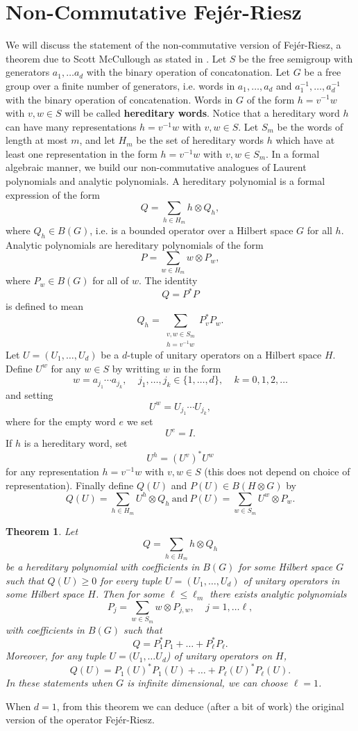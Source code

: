 \documentclass[12 pt]{article}
\theoremstyle{plain}
\newtheorem{theorem}{Theorem}[section]
\theoremstyle{definition}
\begin{document}
\section{Non-Commutative Fej\'{e}r-Riesz} We will discuss the statement of the non-commutative version of Fej\'{e}r-Riesz, a theorem due to Scott McCullough as stated in \cite{Dritschel}. Let $S$ be the free semigroup with generators $a_1, \ldots a_d$ with the binary operation of concatonation. Let $G$ be a free group over a finite number of generators, i.e. words in $a_1,\ldots,a_d$ and $a_1^{-1},\ldots, a_d^{-1}$ with the binary operation of concatenation. Words in $G$ of the form $h=v^{-1}w$  with $v, w\in S$ will be called {\bf hereditary words}. Notice that a hereditary word $h$ can have many representations $h=v^{-1}w$ with $v,w\in S$. Let $S_m$ be the words of length at most $m$, and let $H_m$ be the set of hereditary words $h$ which have at least one representation in the form $h=v^{-1}w$ with $v,w\in S_m$. In a formal algebraic manner, we build our non-commutative analogues of Laurent polynomials and analytic polynomials. A hereditary polynomial is a formal expression of the form
\[Q=\sum_{h\in H_m}h\otimes Q_h,\]
where $Q_h\in B(G)$, i.e. is a bounded operator over a Hilbert space $G$ for all $h$. Analytic polynomials are hereditary polynomials of the form
\[P=\sum_{w\in H_m}w\otimes P_w,\]
where $P_w\in B(G)$ for all of $w$. The identity 
\[Q=P^*P\] 
is defined to mean 
\[Q_h=\sum_{\substack{v,w\in S_m\\ h=v^{-1}w}}P_v^*P_w.\]
Let $U=(U_1, \ldots,U_d)$ be a $d$-tuple of unitary operators on a Hilbert space $H$. Define $U^w$ for any $w\in S$ by writting $w$ in the form 
\[w=a_{j_1}\cdots a_{j_k},\ \ \ \ \ j_1,\ldots ,j_k\in \{1,\ldots ,d\},\ \ \ \ \  k=0,1,2,\ldots\] and setting 
\[U^w=U_{j_1}\cdots U_{j_k},\]
where for the empty word $e$ we set 
\[U^e=I.\]
If $h$ is a hereditary word, set 
\[U^h=(U^v)^*U^w\] for any representation $h=v^{-1}w$ with $v,w\in S$ (this does not depend on choice of representation). Finally define $Q(U)$ and $P(U) \in B(H\otimes G)$ by
\[Q(U)=\sum_{h\in H_m}U^h\otimes Q_h\ \text{and}\ P(U)=\sum_{w\in S_m}U^w\otimes P_w .\]
\begin{theorem}
Let 
\[Q=\sum_{h\in H_m}h\otimes Q_h\]
be a hereditary polynomial with coefficients in $B(G)$ for some Hilbert space $G$ such that $Q(U)\geq 0$ for every tuple $U=(U_1,\ldots , U_d)$ of unitary operators  in some Hilbert space $H$. Then for some $\ell\leq \ell_m$ there exists analytic polynomials 
\[P_j=\sum_{w\in S_m}w\otimes P_{j,w}, \ \ \ \ \ j=1,\ldots \ell,\]
with coefficients in $B(G)$ such that 
\[Q=P_1^*P_1+\ldots +P_\ell^*P_\ell.\]
Moreover, for any tuple $U=(U_1, \ldots U_d$) of unitary operators on $H$, 
\[Q(U)=P_1(U)^*P_1(U)+\ldots +P_{\ell}(U)^*P_{\ell}(U).\]
In these statements when $G$ is infinite dimensional, we can choose $\ell=1$. 
\end{theorem}
When $d=1$, from this theorem we can deduce (after a bit of work) the original version of the operator Fej\'{e}r-Riesz.


\newpage


\end{document}
